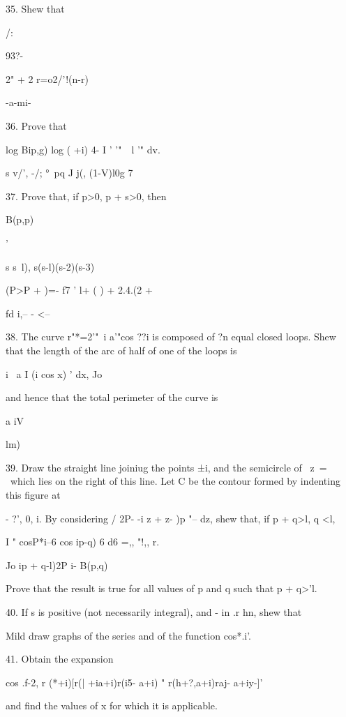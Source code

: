 35. Shew that


/:

93?-

2" + 2 r=o2/'!(n-r)

-a-mi-

36. Prove that

log Bip,g) log ( +i) 4- I ' \: '"\ \ l '" dv. 

s v/', -/; °\ pq J j(, (1-V)l0g 7

37. Prove that, if p>0, p + s>0, then

B(p,p)

 '

s s~l), s(s-l)(s-2)(s-3)

 (P>P + )=- f7 ' l+ ( ) + 2.4.(2 +

fd i,-- - <--

38. The curve r"*=2'"~i a'"cos ??i is composed of ?n equal closed
loops. Shew that the length of the arc of half of one of the loops is

i~ a I (i cos x) ' dx, Jo

and hence that the total perimeter of the curve is

a iV

lm)\

%
%

39. Draw the straight line joiniug the points ±i, and the semicircle
of \ z\ = \ which lies on the right of this line. Let C be the contour
formed by indenting this figure at

- ?', 0, i. By considering / 2P- -i z + z- )p "-- dz, shew that, if p
+ q>l, q <l,

I " cosP*i--6 cos ip-q) 6 d6 =,, "!,, r.

Jo ip + q-l)2P i- B(p,q)

Prove that the result is true for all values of p and q such that p +
q>'l.


40. If s is positive (not necessarily integral), and - in .r hn, shew
that

Mild draw graphs of the series and of the function cos*.i'.

41. Obtain the expansion

cos .f-2, r (*+i)[r(| +ia+i)r(i5- a+i) " r(h+?,a+i)raj- a+iy-]'

and find the values of x for which it is applicable. 

